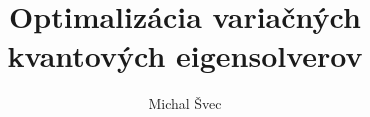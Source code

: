 \documentclass{beamer}
\title{Optimalizácia variačných kvantových eigensolverov}
\author{Michal Švec}
\institute{doc. RNDr. Martin Plesch, PhD.}
\date{}
\begin{document}
\begin{frame}
	\titlepage
\end{frame}

						      
                     

\end{document}
